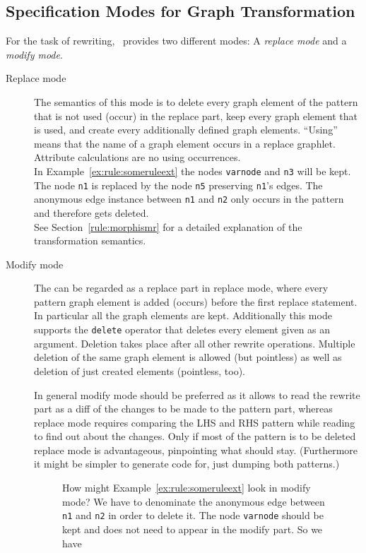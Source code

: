 \subsection{Specification Modes for Graph Transformation}
For the task of rewriting, \GrG\ provides two different modes: A \emph{replace mode} and a \emph{modify mode}.
\begin{description}
  \item[Replace mode] The semantics of this mode is to delete every graph element of the pattern that is not used (occur) in the replace part, keep every graph element that is used, and create every additionally defined graph elements. ``Using'' means that the name of a graph element occurs in a replace graphlet. Attribute calculations are no using occurrences.\\
  In Example~\ref{ex:rule:someruleext} the nodes \texttt{varnode} and \texttt{n3} will be kept. The node \texttt{n1} is replaced by the node \texttt{n5} preserving \texttt{n1}'s edges. The anonymous edge instance between \texttt{n1} and \texttt{n2} only occurs in the pattern and therefore gets deleted.\\
See Section~\ref{rule:morphismr} for a detailed explanation of the transformation semantics.
  \item[Modify mode] The  can be regarded as a replace part in replace mode, where every pattern graph element is added (occurs) before the first replace statement.
In particular all the  graph elements are kept.
Additionally this mode supports the \texttt{delete} operator that deletes every element given as an argument.
Deletion takes place after all other rewrite operations. Multiple deletion of the same graph element is allowed (but pointless) as well as deletion of just created elements (pointless, too).

\begin{note}
In general modify mode should be preferred as it allows to read the rewrite part as a diff of the changes to be made to the pattern part, whereas replace mode requires comparing the LHS and RHS pattern while reading to find out about the changes.
Only if most of the pattern is to be deleted replace mode is advantageous, pinpointing what should stay.
(Furthermore it might be simpler to generate code for, just dumping both patterns.)
\end{note}

\begin{figure}[htbp]
\begin{example}
How might Example~\ref{ex:rule:someruleext} look in modify mode?
We have to denominate the anonymous edge between \texttt{n1} and \texttt{n2} in order to delete it.
The node \texttt{varnode} should be kept and does not need to appear in the modify part.
So we have
\begin{grgen}
rule SomeRuleExtModify(varnode: Node): (Node, EdgeTypeB)  {
  ...
  n1 -e0:Edge-> n2;
  ...
  modify {
    n5:NodeTypeC<n1>;
    n3 -e1:EdgeTypeB-> n5;
    delete(e0);
    eval {
      ...
\end{grgen}
\end{example}
\end{figure}
\end{description}

